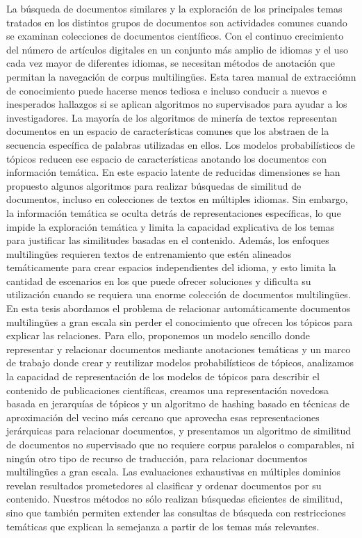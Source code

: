 \cleardoublepage
\begin{abstractslongSpanish}
La búsqueda de documentos similares y la exploración de los principales temas tratados en los distintos grupos de documentos son actividades comunes cuando se examinan colecciones de documentos científicos. Con el continuo crecimiento del número de artículos digitales en un conjunto más amplio de idiomas y el uso cada vez mayor de diferentes idiomas, se necesitan métodos de anotación que permitan la navegación de corpus multilingües. Esta tarea manual de extracciómn de conocimiento puede hacerse menos tediosa e incluso conducir a nuevos e inesperados hallazgos si se aplican algoritmos no supervisados para ayudar a los investigadores. La mayoría de los algoritmos de minería de textos representan documentos en un espacio de características comunes que los abstraen de la secuencia específica de palabras utilizadas en ellos. Los modelos probabilísticos de tópicos reducen ese espacio de características anotando los documentos con información temática. En este espacio latente de reducidas dimensiones se han propuesto algunos algoritmos para realizar búsquedas de similitud de documentos, incluso en colecciones de textos en múltiples idiomas. Sin embargo, la información temática se oculta detrás de representaciones específicas, lo que impide la exploración temática y limita la capacidad explicativa de los temas para justificar las similitudes basadas en el contenido. Además, los enfoques multilingües requieren textos de entrenamiento que estén alineados temáticamente para crear espacios independientes del idioma, y esto limita la cantidad de escenarios en los que puede ofrecer soluciones y dificulta su utilización cuando se requiera una enorme colección de documentos multilingües. En esta tesis abordamos el problema de relacionar automáticamente documentos multilingües a gran escala sin perder el conocimiento que ofrecen los tópicos para explicar las relaciones. Para ello, proponemos un modelo sencillo donde representar y relacionar documentos mediante anotaciones temáticas y un marco de trabajo donde 
crear y reutilizar modelos probabilísticos de tópicos, analizamos la capacidad de representación de los modelos de tópicos para describir el contenido de publicaciones científicas, creamos una representación novedosa basada en jerarquías de tópicos y un algoritmo de hashing basado en técnicas de aproximación del vecino más cercano que aprovecha esas representaciones jerárquicas para relacionar documentos, y presentamos un algoritmo de similitud de documentos no supervisado que no requiere corpus paralelos o comparables, ni ningún otro tipo de recurso de traducción, para relacionar documentos multilingües a gran escala. Las evaluaciones exhaustivas en múltiples dominios revelan resultados prometedores al clasificar y ordenar documentos por su contenido. Nuestros métodos no sólo realizan búsquedas eficientes de similitud, sino que también permiten extender las consultas de búsqueda con restricciones temáticas que explican la semejanza a partir de los temas más relevantes. 

\end{abstractslongSpanish}
